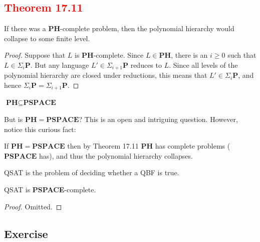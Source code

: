 \subsection{\textcolor{red}{Theorem 17.11}}
\begin{defbox}[\textcolor{red}{Theorem 17.11}]
    If there was a \textbf{PH}-complete problem, then the polynomial hierarchy would collapse to some finite level.
\end{defbox}
\begin{proof}
Suppose that $L$ is \textbf{PH}-complete. Since $L \in \textbf{PH}$, there is an $i \geq 0$ such that $L \in \Sigma_i\mathbf{P}$. But any language $L' \in \Sigma_{i+1}\mathbf{P}$ reduces to $L$. Since all levels of the polynomial hierarchy are closed under reductions, this means that $L' \in \Sigma_i\mathbf{P}$, and hence $\Sigma_i\mathbf{P} = \Sigma_{i+1}\mathbf{P}$.
\end{proof}
\begin{defbox}[Proposition]
    $\textbf{PH}\subseteq\textbf{PSPACE}$
\end{defbox}
But is $\mathbf{PH} = \mathbf{PSPACE}$? This is an open and intriguing question. However, notice this curious fact:
\begin{defbox}[Corollary]
 If $\mathbf{PH} = \mathbf{PSPACE}$ then by Theorem 17.11 $\mathbf{PH}$ has complete problems ($\mathbf{PSPACE}$ has), and thus the polynomial hierarchy collapses.
\end{defbox}
\begin{defbox}[Definition]
    QSAT is the problem of deciding whether a QBF is true. 
\end{defbox}
\begin{defbox}[Theorem]
    QSAT is \textbf{PSPACE}-complete.
\end{defbox}
\begin{proof}
    Omitted.
\end{proof}

\subsection{Exercise}
